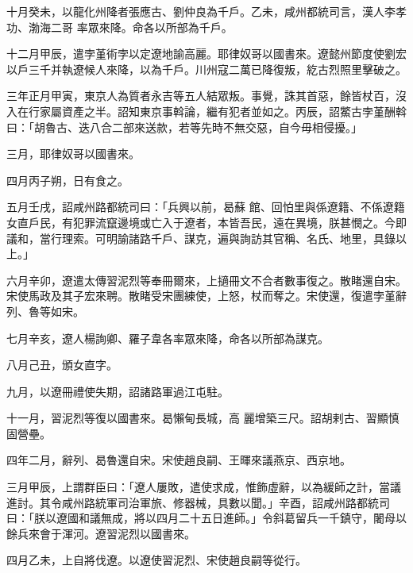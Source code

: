 \begin{pinyinscope}
 十月癸未，以龍化州降者張應古、劉仲良為千戶。乙未，咸州都統司言，漢人李孝功、渤海二哥
 率眾來降。命各以所部為千戶。



 十二月甲辰，遣孛堇術孛以定遼地諭高麗。耶律奴哥以國書來。遼懿州節度使劉宏以戶三千并執遼候人來降，以為千戶。川州寇二萬已降復叛，紇古烈照里擊破之。



 三年正月甲寅，東京人為質者永吉等五人結眾叛。事覺，誅其首惡，餘皆杖百，沒入在行家屬資產之半。詔知東京事斡論，繼有犯者並如之。丙辰，詔鱉古孛堇酬斡曰：「胡魯古、迭八合二部來送款，若等先時不無交惡，自今毋相侵擾。」



 三月，耶律奴哥以國書來。



 四月丙子朔，日有食之。



 五月壬戌，詔咸州路都統司曰：「兵興以前，曷蘇
 館、回怕里與係遼籍、不係遼籍女直戶民，有犯罪流竄邊境或亡入于遼者，本皆吾民，遠在異境，朕甚憫之。今即議和，當行理索。可明諭諸路千戶、謀克，遍與詢訪其官稱、名氏、地里，具錄以上。」



 六月辛卯，遼遣太傳習泥烈等奉冊爾來，上擿冊文不合者數事復之。散睹還自宋。宋使馬政及其子宏來聘。散睹受宋團練使，上怒，杖而奪之。宋使還，復遣孛堇辭列、魯等如宋。



 七月辛亥，遼人楊詢卿、羅子韋各率眾來降，命各以所部為謀克。



 八月己丑，頒女直字。



 九月，以遼冊禮使失期，詔諸路軍過江屯駐。



 十一月，習泥烈等復以國書來。曷懶甸長城，高
 麗增築三尺。詔胡剌古、習顯慎固營壘。



 四年二月，辭列、曷魯還自宋。宋使趙良嗣、王暉來議燕京、西京地。



 三月甲辰，上謂群臣曰：「遼人屢敗，遣使求成，惟飾虛辭，以為緩師之計，當議進討。其令咸州路統軍司治軍旅、修器械，具數以聞。」辛酉，詔咸州路都統司曰：「朕以遼國和議無成，將以四月二十五日進師。」令斜葛留兵一千鎮守，闍母以餘兵來會于渾河。遼習泥烈以國書來。



 四月乙未，上自將伐遼。以遼使習泥烈、宋使趙良嗣等從行。




\end{pinyinscope}
